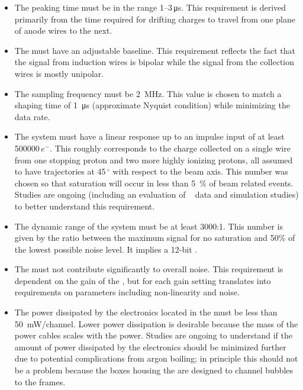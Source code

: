 \begin{itemize}
\item{The  peaking time must  %
be  in the range \numrange{1}{3}\,\si{\micro\second}.  This requirement is derived primarily from the time required for drifting charges to travel from one plane of anode wires to the next.}
\item{The  must %
 have an adjustable baseline.  This requirement reflects the fact that the signal from induction wires is bipolar while the signal from the collection wires is mostly unipolar.}
\item{The  sampling frequency must %
be \SI{2}{MHz}.  This value is chosen to match a  shaping time of \SI{1}{\micro\second} (approximate Nyquist condition) while minimizing the data rate.}
\item{The system must 
have a linear response up to an impulse input of at least \num{500000}\,$e^{-}$.  This roughly corresponds to the charge collected on a single wire from one stopping proton and two more highly ionizing protons, all assumed to have trajectories at \num{45}\,$^{\circ}$ with respect to the beam axis.  This number was chosen so that saturation will occur in less than \SI{5}{\%} of beam related events.  Studies are ongoing (including an evaluation of \lariat~\cite{Cavanna:2014iqa} data and simulation studies) to better understand this requirement.}
\item{The dynamic range of the system must be at least \num{3000}:\num{1}. This number is given by the ratio between the maximum signal for no saturation and 50\% of the lowest possible noise level.  It implies a \num{12}-bit .}
\item{The  must not contribute significantly to overall  noise. This requirement is dependent on the gain of the , but for each gain setting translates into requirements on  parameters including non-linearity and noise.}
\item{The power dissipated by the electronics located in the \lar must 
be less than \SI{50}{mW/channel}.  Lower power dissipation is desirable because the mass of the power cables scales with the power.  Studies are ongoing to understand if the amount of power dissipated by the electronics should be minimized further due to potential complications from argon boiling; in principle this should not be a problem because the  boxes housing the  are designed to channel bubbles to the  frames.}
\end{itemize}

